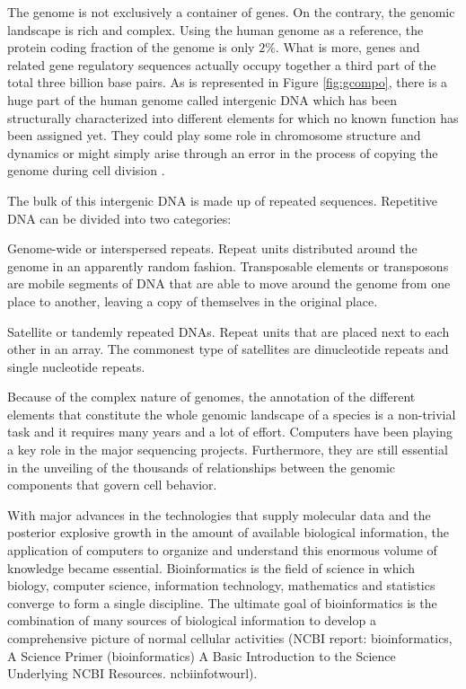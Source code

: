 The genome is not exclusively a container of genes. On the contrary, the genomic landscape 
is rich and complex. Using the human genome as a reference, the protein coding fraction of the genome is only
$2$\%. What is more, genes and related gene regulatory sequences actually occupy together a third part 
of the total three billion base pairs. As is represented in Figure \ref{fig:gcompo}, there is 
a huge part of the human genome called intergenic DNA 
which has been structurally characterized into 
different elements for which no known function has been assigned yet. They could play some role in 
chromosome structure and dynamics or might simply arise through an error in the process of copying 
the genome during cell division \citep{brown:1999a}.

The bulk of this intergenic DNA is made up of repeated sequences. Repetitive DNA can be divided into
two categories: 

\begin{menumerate} 
\item
Genome-wide or interspersed repeats. Repeat units distributed around the genome in an apparently 
random fashion. Transposable elements or transposons are mobile segments of DNA that are able to 
move around the genome from one place to another, leaving a copy of themselves in the original place.
\item
Satellite or tandemly repeated DNAs. Repeat units that are placed next to each other in an array. 
The commonest type of satellites are dinucleotide repeats and single nucleotide repeats.
\end{menumerate}

Because of the complex nature of genomes, the annotation of the different elements that constitute 
the whole genomic landscape of a species is a non-trivial task and it requires many years and a 
lot of effort. Computers have been playing a key role in the major sequencing projects. Furthermore, 
they are still essential in the unveiling of the thousands of relationships between the genomic 
components that govern cell behavior.


\clearpage
{}\label{sec:gera}


With major advances in the technologies that supply molecular data and the posterior explosive growth 
in the amount of available biological information, the application of computers to organize and 
understand this enormous volume of knowledge became essential. Bioinformatics is the field of science 
in which biology, computer science, information technology, mathematics and statistics converge to form 
a single discipline. The ultimate goal of bioinformatics is the combination of many sources of 
biological information to develop a comprehensive picture of normal cellular activities
(NCBI report: bioinformatics,
    { A Science Primer (bioinformatics)}
    {%
      A Basic Introduction to the Science Underlying NCBI Resources.
    }%
    {ncbiinfotwourl}).


